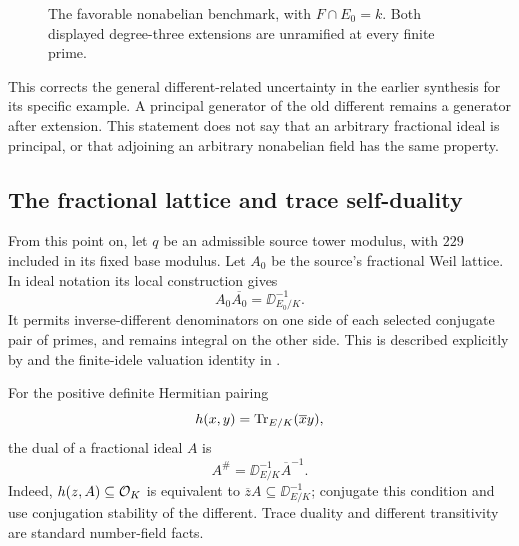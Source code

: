 \begin{figure}[htbp]
\centering
{}
\caption{The favorable nonabelian benchmark, with $F\cap E_0=k$. Both displayed degree-three extensions are unramified at every finite prime.}
\end{figure}

This corrects the general different-related uncertainty in the earlier synthesis for its specific example. A principal generator of the old different remains a generator after extension. This statement does not say that an arbitrary fractional ideal is principal, or that adjoining an arbitrary nonabelian field has the same property.

\subsection{The fractional lattice and trace self-duality}

From this point on, let $q$ be an admissible source tower modulus, with $229$ included in its fixed base modulus. Let $A_0$ be the source's fractional Weil lattice. In ideal notation its local construction gives
\begin{equation}\label{eq:half-different}
 A_0\overline{A_0}=\DD_{E_0/K}^{-1}.
\end{equation}
It permits inverse-different denominators on one side of each selected conjugate pair of primes, and remains integral on the other side. This is described explicitly by
 and the finite-idele valuation identity in
.\cite{shortVectors,weilField}

For the positive definite Hermitian pairing
\[
 h(x,y)=\operatorname{Tr}_{E/K}(\overline{x}y),
\]
the dual of a fractional ideal $A$ is
\begin{equation}\label{eq:hermitian-dual}
 A^\#=\DD_{E/K}^{-1}\overline A^{-1}.
\end{equation}
Indeed, $h(z,A)\subseteq\mathcal O_K$ is equivalent to
$\overline z A\subseteq\DD_{E/K}^{-1}$; conjugate this condition and use conjugation stability of the different. Trace duality and different transitivity are standard number-field facts.\cite{Milne}

